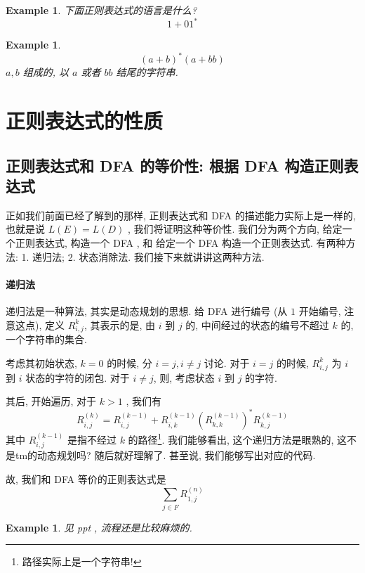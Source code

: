 \documentclass[12pt]{ctexart}
\theoremstyle{definition}
\theoremstyle{definition}
\theoremstyle{plain}
\newtheorem{exam}[definition]{Example}
\begin{document}
\begin{exam}
下面正则表达式的语言是什么? 
\begin{equation}
1 + 0 1 ^{* } 
\end{equation}
\end{exam}
\begin{exam}
\begin{equation}
(a+ b ) ^{*} (a + bb ) 
\end{equation}
\(a , b\) 组成的, 以 \(a\) 或者 \(bb\) 结尾的字符串. 
\end{exam}

\newpage 
\section{正则表达式的性质}%
\subsection{正则表达式和 DFA 的等价性: 根据 DFA 构造正则表达式}

正如我们前面已经了解到的那样, 正则表达式和 DFA 的描述能力实际上是一样的, 也就是说 \(L (E ) = L ( D) \) , 我们将证明这种等价性. 我们分为两个方向, 给定一个正则表达式, 构造一个 DFA , 和 给定一个 DFA 构造一个正则表达式.   有两种方法: 1. 递归法; 2. 状态消除法. 我们接下来就讲讲这两种方法. 
\paragraph{递归法}
递归法是一种算法, 其实是动态规划的思想. 给 DFA 进行编号 (从 \(1\) 开始编号, 注意这点), 定义 \(R _{i , j} ^{k}\), 其表示的是, 由 \(i\) 到 \(j\) 的, 中间经过的状态的编号不超过 \(k\) 的, 一个字符串的集合. 

考虑其初始状态, \(k = 0\) 的时候, 分 \(i = j , i \ne j \) 讨论. 对于 \(i =j \) 的时候, \(R ^{k} _{i, j}\) 为 \(i\) 到 \(i\) 状态的字符的闭包. 对于 \(i \ne j\), 则, 考虑状态 \(i\) 到 \(j\) 的字符.

其后, 开始遍历, 对于 \(k > 1 \) , 我们有
\begin{equation}
R _{i , j } ^{ (k ) } =  R_{i, j} ^{ (k - 1)} + R _{i , k} ^{(k - 1) } ( R _{k , k} ^{ (k -1  )} ) ^{*} R _{k , j} ^{ (k - 1) }
\end{equation}
其中 \(R _{i, j} ^{ (k -1) }\) 是指不经过 \(k\) 的路径\footnote{路径实际上是一个字符串!}. 我们能够看出, 这个递归方法是眼熟的, 这不是tm的动态规划吗? 随后就好理解了.  甚至说, 我们能够写出对应的代码. 

故, 我们和 DFA 等价的正则表达式是
\begin{equation}
\sum _{j \in F} R _{1, j} ^{(n)}
\end{equation}
\begin{exam}
见 ppt , 流程还是比较麻烦的.
\end{exam}
\end{document}

